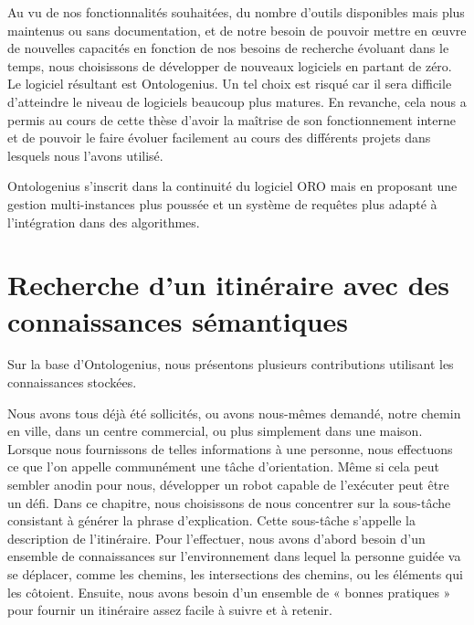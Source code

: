 Au vu de nos fonctionnalités souhaitées, du nombre d'outils disponibles mais plus maintenus ou sans documentation, et de notre besoin de pouvoir mettre en œuvre de nouvelles capacités en fonction de nos besoins de recherche évoluant dans le temps, nous choisissons de développer de nouveaux logiciels en partant de zéro. Le logiciel résultant est Ontologenius. Un tel choix est risqué car il sera difficile d'atteindre le niveau de logiciels beaucoup plus matures. En revanche, cela nous a permis au cours de cette thèse d'avoir la maîtrise de son fonctionnement interne et de pouvoir le faire évoluer facilement au cours des différents projets dans lesquels nous l'avons utilisé.

Ontologenius s'inscrit dans la continuité du logiciel ORO mais en proposant une gestion multi-instances plus poussée et un système de requêtes plus adapté à l'intégration dans des algorithmes. %

\section*{Recherche d'un itinéraire avec des connaissances sémantiques}

Sur la base d'Ontologenius, nous présentons plusieurs contributions utilisant les connaissances stockées.

Nous avons tous déjà été sollicités, ou avons nous-mêmes demandé, notre chemin en ville, dans un centre commercial, ou plus simplement dans une maison. Lorsque nous fournissons de telles informations à une personne, nous effectuons ce que l'on appelle communément une tâche d'orientation. Même si cela peut sembler anodin pour nous, développer un robot capable de l'exécuter peut être un défi. Dans ce chapitre, nous choisissons de nous concentrer sur la sous-tâche consistant à générer la phrase d'explication. Cette sous-tâche s'appelle la description de l'itinéraire. Pour l'effectuer, nous avons d'abord besoin d'un ensemble de connaissances sur l'environnement dans lequel la personne guidée va se déplacer, comme les chemins, les intersections des chemins, ou les éléments qui les côtoient. Ensuite, nous avons besoin d'un ensemble de « bonnes pratiques » pour fournir un itinéraire assez facile à suivre et à retenir.

